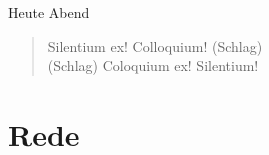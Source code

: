 Heute Abend

\begin{quote}
    Silentium ex! Colloquium! (Schlag)\\
    (Schlag) Coloquium ex! Silentium!
\end{quote}
\newpage
\section{Rede}